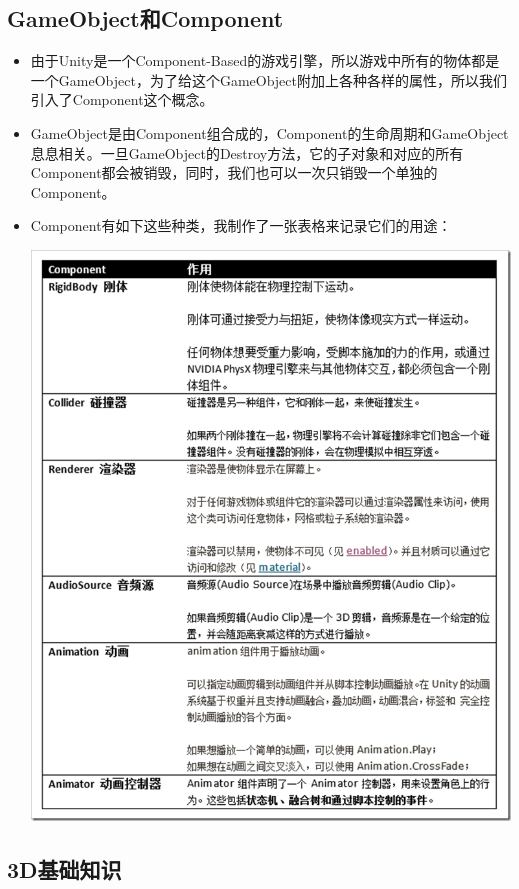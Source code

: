 \documentclass[9pt, b5paper]{article}
\begin{document}
\subsection{GameObject和Component}
\label{sec:org40f047a}
\begin{itemize}
\item 由于Unity是一个Component-Based的游戏引擎，所以游戏中所有的物体都是一个GameObject，为了给这个GameObject附加上各种各样的属性，所以我们引入了Component这个概念。
\item GameObject是由Component组合成的，Component的生命周期和GameObject息息相关。一旦GameObject的Destroy方法，它的子对象和对应的所有Component都会被销毁，同时，我们也可以一次只销毁一个单独的Component。
\item Component有如下这些种类，我制作了一张表格来记录它们的用途：

\begin{center}
\includegraphics[width=.9\linewidth]{./pic/components.png}
\end{center}
\end{itemize}
\subsection{3D基础知识}
\label{sec:orgf74bfeb}
\end{document}
